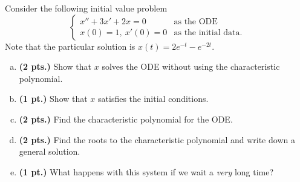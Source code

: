 \documentclass[12pt]{amsbook}
\begin{document}
\begin{problem}
Consider the following initial value problem
\[
\begin{cases}
	x''+3x'+2x = 0 & \textrm{as the ODE}\\
	x(0)=1,~x'(0)=0 &\textrm{as the initial data}.
	\end{cases}
\]
Note that the particular solution is $x(t)=2 e^{-t}-e^{-2t}$.
\begin{enumerate}[(a)]
	\item \textbf{(2 pts.)} Show that $x$ solves the ODE without using the characteristic polynomial.
	\item \textbf{(1 pt.)} Show that $x$ satisfies the initial conditions.
	\item \textbf{(2 pts.)} Find the characteristic polynomial for the ODE.
	\item \textbf{(2 pts.)} Find the roots to the characteristic polynomial and write down a general solution.
	\item \textbf{(1 pt.)} What happens with this system if we wait a \emph{very} long time?
\end{enumerate}
\end{problem}
\end{document}

